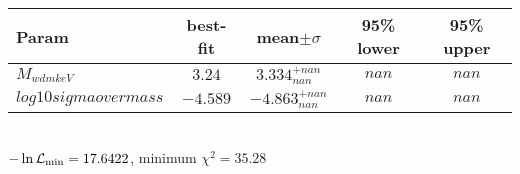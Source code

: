 \begin{tabular}{|l|c|c|c|c|} 
 \hline 
Param & best-fit & mean$\pm\sigma$ & 95\% lower & 95\% upper \\ \hline 
$M_{wdm keV }$ &$3.24$ & $3.334_{nan}^{+nan}$ & $nan$ & $nan$ \\ 
$log10sigmaovermass$ &$-4.589$ & $-4.863_{nan}^{+nan}$ & $nan$ & $nan$ \\ 
\hline 
 \end{tabular} \\ 
$-\ln{\cal L}_\mathrm{min} =17.6422$, minimum $\chi^2=35.28$ \\ 
